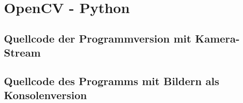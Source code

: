 
\section{OpenCV - Python}
\label{sec:OpenCV}

\subsection{Quellcode der Programmversion mit Kamera-Stream}
\lstset{language=Python}


\subsection{Quellcode des Programms mit Bildern als Konsolenversion}
\lstset{language=Python}

